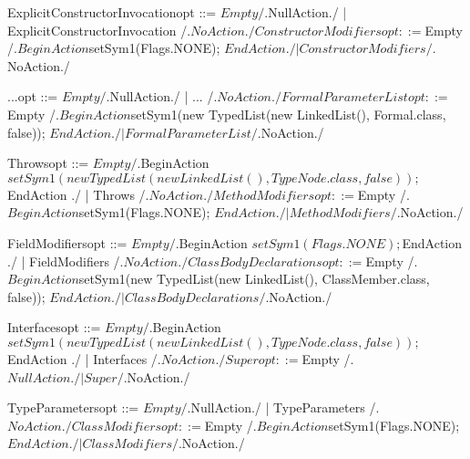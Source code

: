     ExplicitConstructorInvocationopt ::= $Empty
        /.$NullAction./
                                       | ExplicitConstructorInvocation
        /.$NoAction./

    ConstructorModifiersopt ::= $Empty
        /.$BeginAction
                    $setSym1(Flags.NONE);
          $EndAction
        ./
                              | ConstructorModifiers
        /.$NoAction./

    ...opt ::= $Empty
        /.$NullAction./
             | ...
        /.$NoAction./

    FormalParameterListopt ::= $Empty
        /.$BeginAction
                    $setSym1(new TypedList(new LinkedList(), Formal.class, false));
          $EndAction
        ./
                             | FormalParameterList
        /.$NoAction./

    Throwsopt ::= $Empty
        /.$BeginAction
                    $setSym1(new TypedList(new LinkedList(), TypeNode.class, false));
          $EndAction
        ./
                | Throws
        /.$NoAction./

    MethodModifiersopt ::= $Empty
        /.$BeginAction
                    $setSym1(Flags.NONE);
          $EndAction
        ./
                         | MethodModifiers
        /.$NoAction./

    FieldModifiersopt ::= $Empty
        /.$BeginAction
                    $setSym1(Flags.NONE);
          $EndAction
        ./
                        | FieldModifiers
        /.$NoAction./

    ClassBodyDeclarationsopt ::= $Empty
        /.$BeginAction
                    $setSym1(new TypedList(new LinkedList(), ClassMember.class, false));
          $EndAction
        ./
                               | ClassBodyDeclarations
        /.$NoAction./

    Interfacesopt ::= $Empty
        /.$BeginAction
                    $setSym1(new TypedList(new LinkedList(), TypeNode.class, false));
          $EndAction
        ./
                    | Interfaces
        /.$NoAction./

    Superopt ::= $Empty
        /.$NullAction./
               | Super
        /.$NoAction./

    TypeParametersopt ::= $Empty
        /.$NullAction./
                        | TypeParameters
        /.$NoAction./

    ClassModifiersopt ::= $Empty
        /.$BeginAction
                    $setSym1(Flags.NONE);
          $EndAction
        ./
                        | ClassModifiers
        /.$NoAction./

